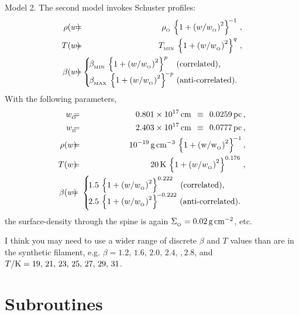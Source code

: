 \documentclass[usenatbib]{mn2e}
\newcommand{\subB}{_{_{\rm B}}}
\newcommand{\subO}{_{_{\rm O}}}
\numberwithin{equation}{section}
\begin{document}
{\sc Model 2.} The second model invokes Schuster profiles:
\begin{eqnarray}
\rho(w)\!\!&\!\!\!=\!\!\!&\!\!\rho\subO\,\left\{1+\left(w/w\subO\right)^2\right\}^{\!-1}\,,\\
T(w)\!\!&\!\!\!=\!\!\!&\!\!T_{_{\rm MIN}}\,\left\{1+\left(w/w\subO\right)^2\right\}^q\,,\\
\beta(w)\!\!&\!\!\!=\!\!\!&\!\!\left\{\!\!\!\!\begin{array}{l}
\beta_{_{\rm MIN}}\,\left\{1+\left(w/w\subO\right)^2\right\}^{p}\,\;\;\,\mbox{(correlated),}\\
\beta_{_{\rm MAX}}\,\left\{1+\left(w/w\subO\right)^2\right\}^{\!-p}\,\mbox{(anti-correlated).}\\
\end{array}\right.
\end{eqnarray}
With the following parameters,
\begin{eqnarray}
w\subO\!\!&\!\!=\!\!&\!\!0.801\times 10^{17}\,\rm{cm}\;\,\equiv\;\,0.0259\,\rm{pc}\,,\\
w\subB\!\!&\!\!=\!\!&\!\!2.403\times 10^{17}\,\rm{cm}\;\,\equiv\;\,0.0777\,\rm{pc}\,,\\
\rho(w)\!\!&\!\!=\!\!&\!\!10^{-19}\,\rm{g\,cm^{-3}}\,\left\{1+\left(w/w\subO\right)^2\right\}^{\!-1},\\
T(w)\!\!&\!\!=\!\!&\!\!20\,{\rm K}\,\left\{1+\left(w/w\subO\right)^2\right\}^{0.176}\,,\\
\beta(w)\!\!&\!\!\!=\!\!\!&\!\!\left\{\!\!\!\!\begin{array}{l}
1.5\,\left\{1+\left(w/w\subO\right)^2\right\}^{0.222}\,\;\;\mbox{(correlated),}\\
2.5\,\left\{1+\left(w/w\subO\right)^2\right\}^{\!-0.222}\,\mbox{(anti-correlated).}\\
\end{array}\right.
\end{eqnarray}
the surface-density through the spine is again $\Sigma\subO=0.02\,\rm{g\,cm^{-2}}$, etc.

I think you may need to use a wider range of discrete $\beta$ and $T$ values than are in the synthetic filament, e.g. $\beta=1.2,\,1.6,\,2.0,\,2.4,\,,2.8$, and $T/{\rm K}=19,\,21,\,23,\,25,\,27,\,29,\,31$.













\section{Subroutines}
\end{document}
